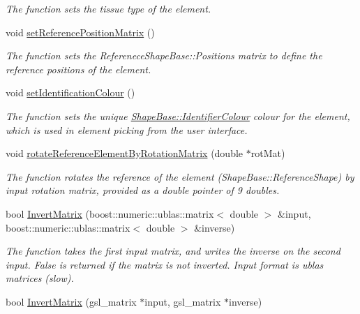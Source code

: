 \begin{DoxyCompactItemize}
\begin{DoxyCompactList}\small\item\em The function sets the tissue type of the element. \end{DoxyCompactList}\item 
void \hyperlink{classShapeBase_aa260269fe9605765f5adb494d1a99737}{set\+Reference\+Position\+Matrix} ()
\begin{DoxyCompactList}\small\item\em The function sets the Referenece\+Shape\+Base\+::\+Positions matrix to define the reference positions of the element. \end{DoxyCompactList}\item 
void \hyperlink{classShapeBase_a8dafd8524fe5aa5326173aa49a8f78a0}{set\+Identification\+Colour} ()
\begin{DoxyCompactList}\small\item\em The function sets the unique \hyperlink{classShapeBase_a02035767d6d169d4a2c1db5f6af8a218}{Shape\+Base\+::\+Identifier\+Colour} colour for the element, which is used in element picking from the user interface. \end{DoxyCompactList}\item 
\hypertarget{classShapeBase_afec65d5b9fd12a8dd8f1b28152f5ee93}{}void \hyperlink{classShapeBase_afec65d5b9fd12a8dd8f1b28152f5ee93}{rotate\+Reference\+Element\+By\+Rotation\+Matrix} (double $\ast$rot\+Mat)\label{classShapeBase_afec65d5b9fd12a8dd8f1b28152f5ee93}

\begin{DoxyCompactList}\small\item\em The function rotates the reference of the element (Shape\+Base\+::\+Reference\+Shape) by input rotation matrix, provided as a double pointer of 9 doubles. \end{DoxyCompactList}\item 
\hypertarget{classShapeBase_ab887eaa6a0be56e3b50f549326dbe87a}{}bool \hyperlink{classShapeBase_ab887eaa6a0be56e3b50f549326dbe87a}{Invert\+Matrix} (boost\+::numeric\+::ublas\+::matrix$<$ double $>$ \&input, boost\+::numeric\+::ublas\+::matrix$<$ double $>$ \&inverse)\label{classShapeBase_ab887eaa6a0be56e3b50f549326dbe87a}

\begin{DoxyCompactList}\small\item\em The function takes the first input matrix, and writes the inverse on the second input. False is returned if the matrix is not inverted. Input format is ublas matrices (slow). \end{DoxyCompactList}\item 
\hypertarget{classShapeBase_ab0a890c07a2fa8ac45fa50bdbfe6b0d9}{}bool \hyperlink{classShapeBase_ab0a890c07a2fa8ac45fa50bdbfe6b0d9}{Invert\+Matrix} (gsl\+\_\+matrix $\ast$input, gsl\+\_\+matrix $\ast$inverse)\label{classShapeBase_ab0a890c07a2fa8ac45fa50bdbfe6b0d9}


\end{DoxyCompactItemize}
